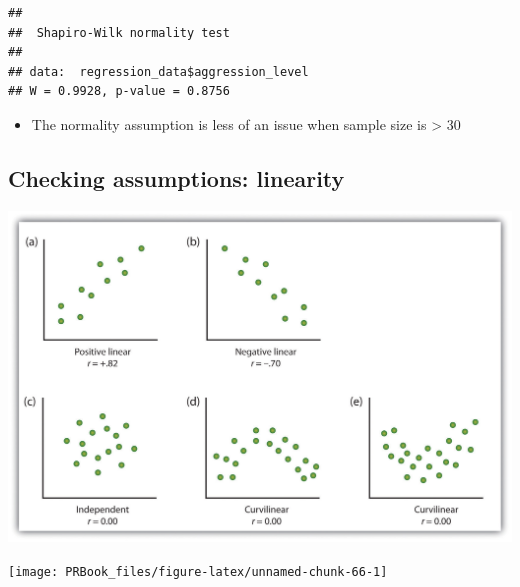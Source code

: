 \documentclass[
]{book}
\newenvironment{Shaded}{\begin{snugshade}}{\end{snugshade}}
\newcommand{\DataTypeTok}[1]{\textcolor[rgb]{0.13,0.29,0.53}{#1}}
\newcommand{\KeywordTok}[1]{\textcolor[rgb]{0.13,0.29,0.53}{\textbf{#1}}}
\newcommand{\NormalTok}[1]{#1}
\newcommand{\OperatorTok}[1]{\textcolor[rgb]{0.81,0.36,0.00}{\textbf{#1}}}
\newcommand{\StringTok}[1]{\textcolor[rgb]{0.31,0.60,0.02}{#1}}
\providecommand{\tightlist}{%
  \setlength{\itemsep}{0pt}\setlength{\parskip}{0pt}}
\begin{document}
\begin{verbatim}
## 
##  Shapiro-Wilk normality test
## 
## data:  regression_data$aggression_level
## W = 0.9928, p-value = 0.8756
\end{verbatim}

\begin{itemize}
\tightlist
\item
  The normality assumption is less of an issue when sample size is \textgreater{} 30
\end{itemize}

\hypertarget{checking-assumptions-linearity}{%
\subsection{Checking assumptions: linearity}\label{checking-assumptions-linearity}}

\begin{center}\includegraphics[width=23.97in]{img/curvilinear} \end{center}

\begin{Shaded}
\end{Shaded}

\begin{center}\texttt{[image: PRBook\_files/figure-latex/unnamed-chunk-66-1]} \end{center}
\end{document}
